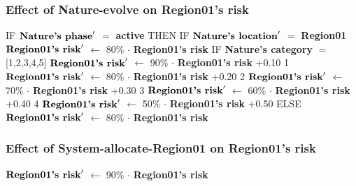 \documentclass{article}%
\begin{document}
\subsubsection{Effect of Nature{-}evolve on Region01's risk}%
\label{ssubsec:Effect of Nature{-}evolve on Region01's risk}%
\begin{flushleft}%
IF %
$\mbox{\textbf{Nature's phase}} '$%
$=$%
\textbf{active}%
\linebreak%
\hspace*{2em}%
THEN %
IF %
$\mbox{\textbf{Nature's location}} '$%
$=$%
\textbf{Region01}%
\linebreak%
\hspace*{4em}%
$\mbox{\textbf{Region01's risk}} '$%
$\leftarrow$%
80\%%
$\cdot$%
\textbf{Region01's risk}%
\linebreak%
\hspace*{4em}%
IF %
\textbf{Nature's category}%
$=$%
{[}1,2,3,4,5{]}%
\linebreak%
\hspace*{6em}%
$\mbox{\textbf{Region01's risk}} '$%
$\leftarrow$%
90\%%
$\cdot$%
\textbf{Region01's risk}%
+0.10%
\linebreak%
\hspace*{6em}%
1 %
$\mbox{\textbf{Region01's risk}} '$%
$\leftarrow$%
80\%%
$\cdot$%
\textbf{Region01's risk}%
+0.20%
\linebreak%
\hspace*{6em}%
2 %
$\mbox{\textbf{Region01's risk}} '$%
$\leftarrow$%
70\%%
$\cdot$%
\textbf{Region01's risk}%
+0.30%
\linebreak%
\hspace*{6em}%
3 %
$\mbox{\textbf{Region01's risk}} '$%
$\leftarrow$%
60\%%
$\cdot$%
\textbf{Region01's risk}%
+0.40%
\linebreak%
\hspace*{6em}%
4 %
$\mbox{\textbf{Region01's risk}} '$%
$\leftarrow$%
50\%%
$\cdot$%
\textbf{Region01's risk}%
+0.50%
\linebreak%
\hspace*{2em}%
ELSE %
$\mbox{\textbf{Region01's risk}} '$%
$\leftarrow$%
80\%%
$\cdot$%
\textbf{Region01's risk}%
\end{flushleft}

%
\subsubsection{Effect of System{-}allocate{-}Region01 on Region01's risk}%
\label{ssubsec:Effect of System{-}allocate{-}Region01 on Region01's risk}%
\begin{flushleft}%
$\mbox{\textbf{Region01's risk}} '$%
$\leftarrow$%
90\%%
$\cdot$%
\textbf{Region01's risk}%
\end{flushleft}
\end{document}
